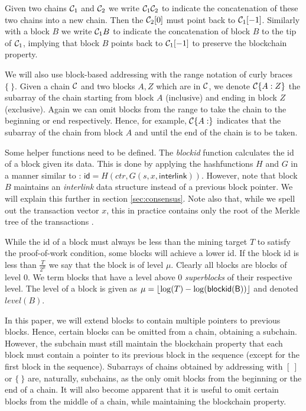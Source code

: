 Given two chains $\mathcal{C}_1$ and $\mathcal{C}_2$ we write $\mathcal{C}_1 \mathcal{C}_2$ to
indicate the concatenation of these two chains into a new chain. Then the
$\mathcal{C}_2[0]$ must point back to $\mathcal{C}_1[-1]$. Similarly with a block $B$ we
write $\mathcal{C}_1 B$ to indicate the concatenation of block $B$ to the tip of
$\mathcal{C}_1$, implying that block $B$ points back to $\mathcal{C}_1[-1]$ to preserve
the blockchain property.

We will also use block-based addressing with the range notation of curly braces $\{~\}$.
Given a chain $\mathcal{C}$ and two blocks $A, Z$ which are in $\mathcal{C}$, we denote
$\mathcal{C}\{A:Z\}$ the subarray of the chain starting from block $A$ (inclusive)
and ending in block $Z$ (exclusive). Again we can omit blocks from the range to
take the chain to the beginning or end respectively. Hence, for example,
$\mathcal{C}\{A:\}$ indicates that the subarray of the chain from block $A$ and until
the end of the chain is to be taken.

Some helper functions need to be defined. The \textit{blockid} function
calculates the id of a block given its data. This is done by applying the
hashfunctions $H$ and $G$ in a manner similar to \cite{backbone}: $\textsf{id} =
H(ctr, G(s, x, \textsf{interlink}))$. However, note that block $B$ maintains an
\textit{interlink} data structure instead of a previous block pointer. We will
explain this further in section \ref{sec:consensus}. Note also that, while we
spell out the transaction vector $x$, this in practice contains only the root of
the Merkle tree of the transactions \cite{princetonbook}.

While the id of a block must always be less than the mining target $T$ to
satisfy the proof-of-work condition\cite{antonopoulosbook}, some blocks will
achieve a lower id. If the block id is less than $\frac{T}{2^\mu}$ we say that
the block is of level $\mu$. Clearly all blocks are blocks of level $0$. We term
blocks that have a level above 0 \textit{superblocks} of their respective level.
The level of a block is given as $\mu = \left \lfloor \log(T) -
\log(\sf{blockid}(B)) \right \rfloor$ and denoted $\textit{level}(B)$.

In this paper, we will extend blocks to contain multiple pointers to previous
blocks. Hence, certain blocks can be omitted from a chain, obtaining a subchain.
However, the subchain must still maintain the blockchain property that each
block must contain a pointer to its previous block in the sequence (except for
the first block in the sequence). Subarrays of chains obtained by addressing
with $[~]$ or $\{~\}$ are, naturally, subchains, as the only omit blocks from
the beginning or the end of a chain. It will also become apparent that it is
useful to omit certain blocks from the middle of a chain, while maintaining the
blockchain property.

